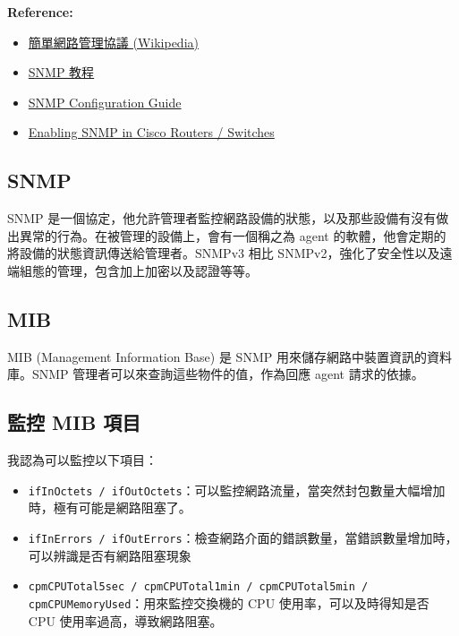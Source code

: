 \documentclass[12pt]{article}
\newenvironment{mycolorbox}[1][gray]{
  \renewmdenv[
    linewidth=2pt, linecolor=#1, backgroundcolor=#1!10,
    topline=false, bottomline=false, rightline=false,
    skipabove=10pt, skipbelow=10pt, innerleftmargin=10pt,
    innerrightmargin=0pt, innertopmargin=5pt, innerbottommargin=5pt
  ]{myquote}
  \begin{myquote}
}{\end{myquote}}
\begin{document}
\begin{mycolorbox}[teal]
  \textbf{Reference:}
  \begin{itemize}
    \item \href{https://zh.wikipedia.org/zh-tw/%E7%AE%80%E5%8D%95%E7%BD%91%E7%BB%9C%E7%AE%A1%E7%90%86%E5%8D%8F%E8%AE%AE}{簡單網路管理協議 (Wikipedia)}
    \item \href{https://www.manageengine.com/tw/network-monitoring/what-is-snmp.html#snmp-version}{SNMP 教程}
    \item \href{https://www.cisco.com/c/en/us/td/docs/ios-xml/ios/snmp/configuration/xe-16/snmp-xe-16-book/nm-snmp-cfg-snmp-support.html#GUID-D77A13E8-EFF6-435E-BB74-1BBBB390901B}{SNMP Configuration Guide}
    \item \href{https://www.manageengine.com/products/oputils/enable-snmp-cisco-router.html}{Enabling SNMP in Cisco Routers / Switches}
  \end{itemize}
\end{mycolorbox}

\subsection{SNMP} 
  SNMP 是一個協定，他允許管理者監控網路設備的狀態，以及那些設備有沒有做出異常的行為。在被管理的設備上，會有一個稱之為 agent 的軟體，他會定期的將設備的狀態資訊傳送給管理者。SNMPv3 相比 SNMPv2，強化了安全性以及遠端組態的管理，包含加上加密以及認證等等。
\subsection{MIB}
  MIB (Management Information Base) 是 SNMP 用來儲存網路中裝置資訊的資料庫。SNMP 管理者可以來查詢這些物件的值，作為回應 agent 請求的依據。
\subsection{監控 MIB 項目}
我認為可以監控以下項目：
\begin{itemize}
  \item \texttt{ifInOctets / ifOutOctets}：可以監控網路流量，當突然封包數量大幅增加時，極有可能是網路阻塞了。
  \item \texttt{ifInErrors / ifOutErrors}：檢查網路介面的錯誤數量，當錯誤數量增加時，可以辨識是否有網路阻塞現象
  \item \texttt{cpmCPUTotal5sec / cpmCPUTotal1min / cpmCPUTotal5min / cpmCPUMemoryUsed}：用來監控交換機的 CPU 使用率，可以及時得知是否 CPU 使用率過高，導致網路阻塞。
\end{itemize}
\end{document}
